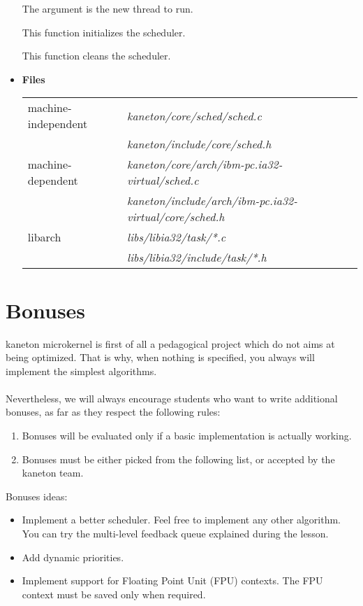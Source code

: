 \begin{itemize}
{	   
		    {
		      The argument  is the new
		      thread to run.
		    }
	 }

	 {
	   This function initializes the scheduler.
	 }

	 {
	   This function cleans the scheduler.
	 }

  \item {\bf Files}\\

    \begin{tabular}{| l | l |}
      \hline
      machine-independent & {\em kaneton/core/sched/sched.c}\\
      &  {\em kaneton/include/core/sched.h}\\\hline
      machine-dependent & {\em kaneton/core/arch/ibm-pc.ia32-virtual/sched.c}\\
      & {\em kaneton/include/arch/ibm-pc.ia32-virtual/core/sched.h}\\\hline
      libarch & {\em libs/libia32/task/*.c}\\
      &  {\em libs/libia32/include/task/*.h}\\\hline
    \end{tabular}

\end{itemize}

%
%

\newpage

\section{Bonuses}

kaneton microkernel is first of all a pedagogical project which do not
aims at being optimized. That is why, when nothing is specified, you
always will implement the simplest algorithms.\\
\\
Nevertheless, we will always encourage students who want to write
additional bonuses, as far as they respect the following rules:

\begin{enumerate}
  \item Bonuses will be evaluated only if a basic implementation is
  actually working.
  \item Bonuses must be either picked from the following list, or
  accepted by the kaneton team.\\
\end{enumerate}

Bonuses ideas:
\begin{itemize}
\item
  Implement a better scheduler. Feel free to implement any other
  algorithm. You can try the multi-level feedback queue explained
  during the lesson.

\item
  Add dynamic priorities.

\item
  Implement support for Floating Point Unit (FPU) contexts. The FPU
  context must be saved only when required.
\end{itemize}
